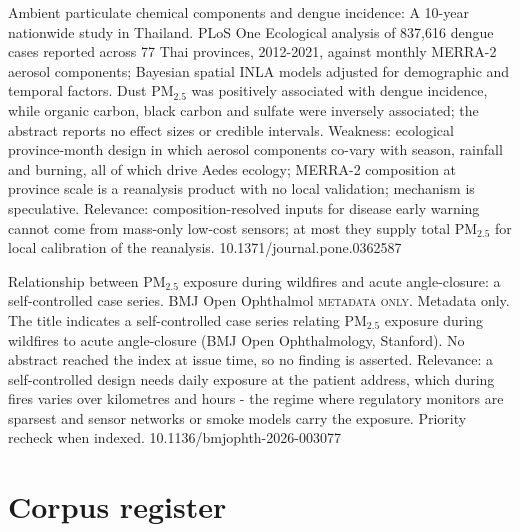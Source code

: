 \documentclass[10pt]{article}
\begin{document}
{Ambient particulate chemical components and dengue incidence: A 10-year nationwide study in Thailand.}
{PLoS One}
{Ecological analysis of 837,616 dengue cases reported across 77 Thai provinces, 2012-2021, against monthly MERRA-2 aerosol components; Bayesian spatial INLA models adjusted for demographic and temporal factors. Dust PM$_{2.5}$ was positively associated with dengue incidence, while organic carbon, black carbon and sulfate were inversely associated; the abstract reports no effect sizes or credible intervals. Weakness: ecological province-month design in which aerosol components co-vary with season, rainfall and burning, all of which drive Aedes ecology; MERRA-2 composition at province scale is a reanalysis product with no local validation; mechanism is speculative. Relevance: composition-resolved inputs for disease early warning cannot come from mass-only low-cost sensors; at most they supply total PM$_{2.5}$ for local calibration of the reanalysis.}
{10.1371/journal.pone.0362587}

{Relationship between PM$_{2.5}$ exposure during wildfires and acute angle-closure: a self-controlled case series.}
{BMJ Open Ophthalmol}
{\textsc{metadata only.} Metadata only. The title indicates a self-controlled case series relating PM$_{2.5}$ exposure during wildfires to acute angle-closure (BMJ Open Ophthalmology, Stanford). No abstract reached the index at issue time, so no finding is asserted. Relevance: a self-controlled design needs daily exposure at the patient address, which during fires varies over kilometres and hours - the regime where regulatory monitors are sparsest and sensor networks or smoke models carry the exposure. Priority recheck when indexed.}
{10.1136/bmjophth-2026-003077}

\clearpage
\section*{\sffamily\bfseries\color{Deep}Corpus register}
\vspace{-1.5mm}{\color{Amber}\rule{\linewidth}{1.1pt}}\vspace{2.5mm}



\vspace{2mm}
\end{document}
